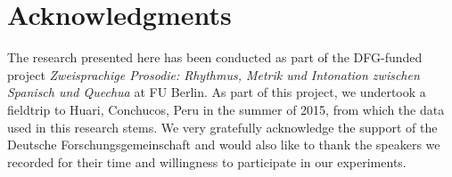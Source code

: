\documentclass[output=paper]{LSP/langsci}
\begin{document}
\section*{Acknowledgments}
The research presented here has been conducted as part of the DFG-funded project \textit{Zwei\-sprachige Prosodie: Rhythmus, Metrik und Intonation zwischen Spanisch und Quechua} at FU Berlin. As part of this project, we undertook a fieldtrip to Huari, Conchucos, Peru in the summer of 2015, from which the data used in this research stems. We very gratefully acknowledge the support of the Deutsche Forschungsgemeinschaft and would also like to thank the speakers we recorded for their time and willingness to participate in our experiments.

{\sloppy
\printbibliography[heading=subbibliography,notkeyword=this]
}
\end{document}
